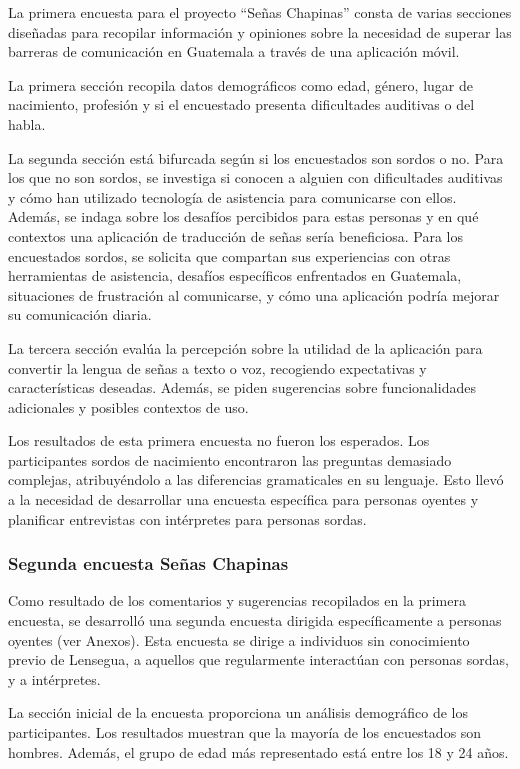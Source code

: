 La primera encuesta para el proyecto ``Señas Chapinas'' consta de varias secciones diseñadas para recopilar información y opiniones sobre la necesidad de superar las barreras de comunicación en Guatemala a través de una aplicación móvil.

La primera sección recopila datos demográficos como edad, género, lugar de nacimiento, profesión y si el encuestado presenta dificultades auditivas o del habla.

La segunda sección está bifurcada según si los encuestados son sordos o no. Para los que no son sordos, se investiga si conocen a alguien con dificultades auditivas y cómo han utilizado tecnología de asistencia para comunicarse con ellos. Además, se indaga sobre los desafíos percibidos para estas personas y en qué contextos una aplicación de traducción de señas sería beneficiosa. Para los encuestados sordos, se solicita que compartan sus experiencias con otras herramientas de asistencia, desafíos específicos enfrentados en Guatemala, situaciones de frustración al comunicarse, y cómo una aplicación podría mejorar su comunicación diaria.

La tercera sección evalúa la percepción sobre la utilidad de la aplicación para convertir la lengua de señas a texto o voz, recogiendo expectativas y características deseadas. Además, se piden sugerencias sobre funcionalidades adicionales y posibles contextos de uso.

Los resultados de esta primera encuesta no fueron los esperados. Los participantes sordos de nacimiento encontraron las preguntas demasiado complejas, atribuyéndolo a las diferencias gramaticales en su lenguaje. Esto llevó a la necesidad de desarrollar una encuesta específica para personas oyentes y planificar entrevistas con intérpretes para personas sordas.


\subsubsection{Segunda encuesta Señas Chapinas}

Como resultado de los comentarios y sugerencias recopilados en la primera encuesta, se desarrolló una segunda encuesta dirigida específicamente a personas oyentes (ver Anexos). Esta encuesta se dirige a individuos sin conocimiento previo de Lensegua, a aquellos que regularmente interactúan con personas sordas, y a intérpretes. 

La sección inicial de la encuesta proporciona un análisis demográfico de los participantes. Los resultados muestran que la mayoría de los encuestados son hombres. Además, el grupo de edad más representado está entre los 18 y 24 años. 

